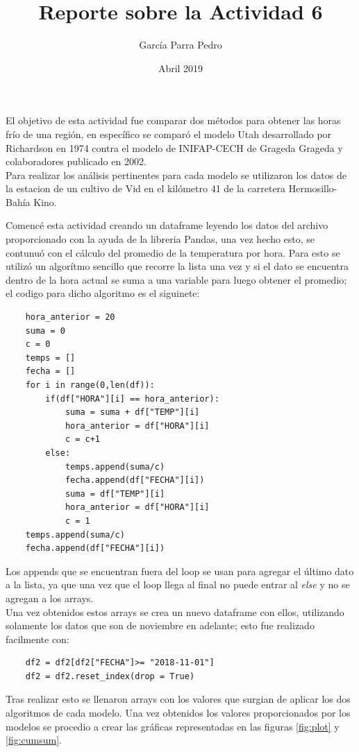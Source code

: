 \documentclass[12pt]{article}
\title{Reporte sobre la Actividad 6}
\author{García Parra Pedro}
\date{Abril 2019}
\begin{document}
\maketitle

El objetivo de esta actividad fue comparar dos métodos para obtener las horas fr\'io de una región, en específico se comparó el modelo Utah desarrollado por Richardson en 1974 contra el modelo de INIFAP-CECH  de Grageda Grageda y colaboradores publicado en 2002. \\
Para realizar los análisis pertinentes para cada modelo se utilizaron los datos de la estacion de un cultivo de Vid en el kilómetro 41 de la carretera Hermosillo-Bahía Kino.

Comencé esta actividad creando un dataframe leyendo los datos del archivo proporcionado con la ayuda de la libreria Pandas, una vez hecho esto, se contunuó con el cálculo del promedio de la temperatura por hora. Para esto se utilizó un algorítmo sencillo que recorre la lista una vez y si el dato se encuentra dentro de la hora actual se suma a una variable para luego obtener el promedio; el codigo para dicho algoritmo es el siguinete:
\begin{verbatim}
    hora_anterior = 20
    suma = 0
    c = 0
    temps = []
    fecha = []
    for i in range(0,len(df)):
        if(df["HORA"][i] == hora_anterior):
            suma = suma + df["TEMP"][i]
            hora_anterior = df["HORA"][i]
            c = c+1
        else:
            temps.append(suma/c)
            fecha.append(df["FECHA"][i])
            suma = df["TEMP"][i]
            hora_anterior = df["HORA"][i]
            c = 1
    temps.append(suma/c)
    fecha.append(df["FECHA"][i])
\end{verbatim}
Los appends que se encuentran fuera del loop se usan para agregar el último dato a la lista, ya que una vez que el loop llega al final no puede entrar al \textit{else} y no se agregan a los arrays.\\
Una vez obtenidos estos arrays se crea un nuevo dataframe con ellos, utilizando solamente los datos que son de noviembre en adelante; esto fue realizado facilmente con:
\begin{verbatim}
    df2 = df2[df2["FECHA"]>= "2018-11-01"]
    df2 = df2.reset_index(drop = True)
\end{verbatim}
Tras realizar esto se llenaron arrays con los valores que surgian de aplicar los dos algoritmos de cada modelo. Una vez obtenidos los valores proporcionados por los modelos se procedio a crear las gráficas representadas en las figuras \ref{fig:plot} y \ref{fig:cumsum}.\\
\end{document}
